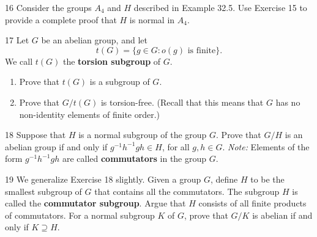 \begin{problem}{16}
    Consider the groups $A_4$ and $H$ described in Example 32.5. Use Exercise 15 to provide
    a complete proof that $H$ is normal in $A_4$.
\end{problem}
\unsolved

\begin{problem}{17}
    Let $G$ be an abelian group, and let
    \[t(G) = \{g \in G : o(g) \text{ is finite}\}.\]
    We call $t(G)$ the \textbf{torsion subgroup} of $G$.
    \begin{enumerate}
        \item[(a)] Prove that $t(G)$ is a subgroup of $G$.
        \item[(b)] Prove that $G/t(G)$ is torsion-free. (Recall that this means that $G$
        has no non-identity elements of finite order.)
    \end{enumerate}
\end{problem}
\unsolved

\begin{problem}{18}
    Suppose that $H$ is a normal subgroup of the group $G$. Prove that $G/H$ is an abelian
    group if and only if $g^{-1}h^{-1}gh \in H$, for all $g, h \in G$. \emph{Note:}
    Elements of the form $g^{-1}h^{-1}gh$ are called \textbf{commutators} in the group $G$.
\end{problem}
\unsolved

\begin{problem}{19}
    We generalize Exercise 18 slightly. Given a group $G$, define $H$ to be the smallest
    subgroup of $G$ that contains all the commutators. The subgroup $H$ is called the
    \textbf{commutator subgroup}. Argue that $H$ consists of all finite products of
    commutators. For a normal subgroup $K$ of $G$, prove that $G/K$ is abelian if and only
    if $K \supseteq H$.
\end{problem}
\unsolved
